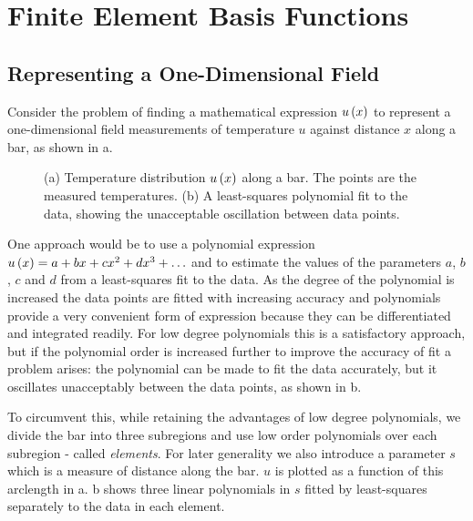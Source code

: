 \chapter{Finite Element Basis Functions}

\section{Representing a One-Dimensional Field}

Consider the problem of finding a mathematical expression $ u\left( x \right) $ to
represent a one-dimensional field \eg measurements of temperature $u$
against distance $x$ along a bar, as shown in a.

\begin{figure}[htbp] \centering
  
  \caption{(a) Temperature distribution $ u\left( x \right) $ along a bar. 
    The points are the measured temperatures. (b) A least-squares polynomial
    fit to the data, showing the unacceptable oscillation between data points.}
  \label{fig:1Dfield}
\end{figure} 

One approach would be to use a polynomial expression $ u\left( x \right)  = a + bx +
cx^{2} + dx^{3} + \ldots$ and to estimate the values of the parameters
$a$, $b$, $c$ and $d$ from a least-squares fit to the data.  As the degree of the
polynomial is increased the data points are fitted with increasing accuracy
and polynomials provide a very convenient form of expression because they can
be differentiated and integrated readily. For low degree polynomials this is a
satisfactory approach, but if the polynomial order is increased further to
improve the accuracy of fit a problem arises: the polynomial can be made to
fit the data accurately, but it oscillates unacceptably between the data
points, as shown in b.  

To circumvent this, while retaining the advantages of low degree polynomials,
we divide the bar into three subregions and use low order polynomials over
each subregion - called \emph{elements}. For later generality we also
introduce a parameter $s$ which is a measure of distance along the bar. $u$ is
plotted as a function of this arclength in a.
b shows three linear polynomials in $s$ fitted by
least-squares separately to the data in each element. 

